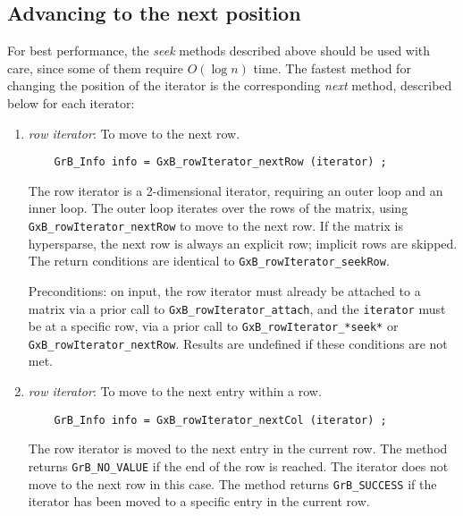 \documentclass[12pt]{article}
\begin{document}
\subsection{Advancing to the next position}

For best performance, the {\em seek} methods described above should be used
with care, since some of them require $O(\log n)$ time.  The fastest method
for changing the position of the iterator is the corresponding {\em next}
method, described below for each iterator:

    \begin{enumerate}
    \item {\em row iterator}:  To move to the next row.

    {\footnotesize
    \begin{verbatim}
    GrB_Info info = GxB_rowIterator_nextRow (iterator) ; \end{verbatim}}

    The row iterator is a 2-dimensional iterator, requiring an outer loop and
    an inner loop.  The outer loop iterates over the rows of the matrix, using
    \verb'GxB_rowIterator_nextRow' to move to the next row.  If the matrix is
    hypersparse, the next row is always an explicit row; implicit rows are
    skipped.  The return conditions are identical to
    \verb'GxB_rowIterator_seekRow'.

    Preconditions: on input, the row iterator must already be attached to a
    matrix via a prior call to \verb'GxB_rowIterator_attach', and the
    \verb'iterator' must be at a specific row, via a prior call to
    \verb'GxB_rowIterator_*seek*' or \verb'GxB_rowIterator_nextRow'. 
    Results are undefined if these conditions are not met.

    \item {\em row iterator}:  To move to the next entry within a row.

    {\footnotesize
    \begin{verbatim}
    GrB_Info info = GxB_rowIterator_nextCol (iterator) ; \end{verbatim}}

    The row iterator is moved to the next entry in the current row.
    The method returns \verb'GrB_NO_VALUE' if the end of the row is reached.
    The iterator does not move to the next row in this case.
    The method returns \verb'GrB_SUCCESS' if the iterator has been moved
    to a specific entry in the current row.


\end{enumerate}
\end{document}
